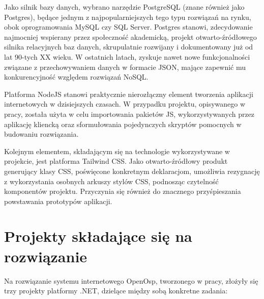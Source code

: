 Jako silnik bazy danych, wybrano narzędzie PostgreSQL (znane również jako Postgres), będące jednym z najpopularniejszych tego typu rozwiązań na rynku, obok oprogramowania MySQL czy SQL Server. Postgres stanowi, zdecydowanie najmocniej wspierany przez społeczność akademicką, projekt otwarto-źródłowego silnika relacyjnych baz danych, skrupulatnie rozwijany i dokumentowany już od lat 90-tych XX wieku. W ostatnich latach, zyskuje nawet nowe funkcjonalności związane z przechowywaniem danych w formacie JSON, mające zapewnić mu konkurencyjność względem rozwiązań NoSQL.

Platforma NodeJS stanowi praktycznie nierozłączny element tworzenia aplikacji internetowych w dzisiejszych czasach. W przypadku projektu, opisywanego w pracy, została użyta w celu importowania pakietów JS, wykorzystywanych przez aplikację kliencką oraz sformułowania pojedynczych skryptów pomocnych w budowaniu rozwiązania.

Kolejnym elementem, składającym się na technologie wykorzystywane w projekcie, jest platforma Tailwind CSS. Jako otwarto-źródłowy produkt generujący klasy CSS, poświęcone konkretnym deklaracjom, umożliwia rezygnację z wykorzystania osobnych arkuszy stylów CSS, podnosząc czytelność komponentów projektu. Przyczynia się również do znacznego przyśpieszania powstawania prototypów aplikacji.

\section{Projekty składające się na rozwiązanie}

Na rozwiązanie systemu internetowego OpenOsp, tworzonego w pracy, złożyły się trzy projekty platformy .NET, dzielące między sobą konkretne zadania:


